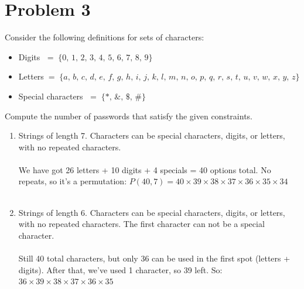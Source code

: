 \documentclass{amsart}
\theoremstyle{definition}
\theoremstyle{Exercise}
\theoremstyle{remark}
\theoremstyle{rule}
\numberwithin{equation}{section}
\begin{document}
   
   \newpage

\section*{Problem 3}
   
 
Consider the following definitions for sets of characters:
\begin{itemize}
  \item Digits $\;=\; \{ 0,\, 1,\, 2,\, 3,\, 4,\, 5,\, 6,\, 7,\, 8,\, 9 \}$\\
  \item Letters$\; = \;\{ a,\, b,\, c, \,d,\, e,\, f,\, g,\, h,\, i,\, j,\, k,\, l,\, m,\, n,\, o,\, p,\, q,\, r,\, s,\, t,\, u,\, v,\, w,\, x,\, y,\, z \}$\\
  \item Special characters $\;=\; \{ *,\, \&,\, \$,\, \# \}$\\
\end{itemize}

Compute the number of passwords that satisfy the given constraints.
    \begin{enumerate}[label=(\roman*)]
    \item Strings of length 7. Characters can be special characters, digits, or letters, with no repeated characters.\\\\
We have got 26 letters + 10 digits + 4 specials = 40 options total.
No repeats, so it’s a permutation:
$P(40, 7) = 40 \times 39 \times 38 \times 37 \times 36 \times 35 \times 34$
\\\\
    \item Strings of length 6. Characters can be special characters, digits, or letters, with no repeated characters. The first character can not be a special character.\\\\
Still 40 total characters, but only 36 can be used in the first spot (letters + digits).
After that, we’ve used 1 character, so 39 left. So:
$36 \times 39 \times 38 \times 37 \times 36 \times 35$
\\\\
      \end{enumerate}
 \newpage
\end{document}
